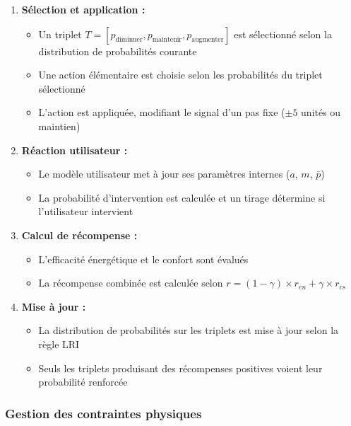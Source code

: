 \documentclass[a4paper,11pt]{article}
\begin{document}
\begin{enumerate}
    \item \textbf{Sélection et application :} 
    \begin{itemize}
        \item Un triplet $T = [p_{\text{diminuer}}, p_{\text{maintenir}}, p_{\text{augmenter}}]$ est sélectionné selon la distribution de probabilités courante
        \item Une action élémentaire est choisie selon les probabilités du triplet sélectionné
        \item L'action est appliquée, modifiant le signal d'un pas fixe ($\pm 5$ unités ou maintien)
    \end{itemize}
    
    \item \textbf{Réaction utilisateur :} 
    \begin{itemize}
        \item Le modèle utilisateur met à jour ses paramètres internes ($a$, $m$, $\bar{p}$)
        \item La probabilité d'intervention est calculée et un tirage détermine si l'utilisateur intervient
    \end{itemize}
    
    \item \textbf{Calcul de récompense :} 
    \begin{itemize}
        \item L'efficacité énergétique et le confort sont évalués
        \item La récompense combinée est calculée selon $r = (1 - \gamma ) \times r_{en} + \gamma \times r_{cs}$
    \end{itemize}
    
    \item \textbf{Mise à jour :} 
    \begin{itemize}
        \item La distribution de probabilités sur les triplets est mise à jour selon la règle LRI
        \item Seuls les triplets produisant des récompenses positives voient leur probabilité renforcée
    \end{itemize}
\end{enumerate}

\subsubsection{Gestion des contraintes physiques}
\end{document}

